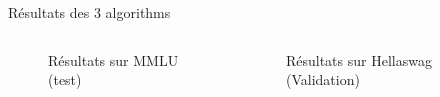 \begin{frame}{Résultats des 3 algorithms}
    \begin{columns}
        \begin{column}{0.45\textwidth}
            \begin{figure}
                \centering
                
                \caption{Résultats sur MMLU (test)}
            \end{figure}
        \end{column}
        \begin{column}{0.45\textwidth}
            \begin{figure}
                \centering
                
                \caption{Résultats sur Hellaswag (Validation)}
            \end{figure}
        \end{column}
    \end{columns}
\end{frame}

